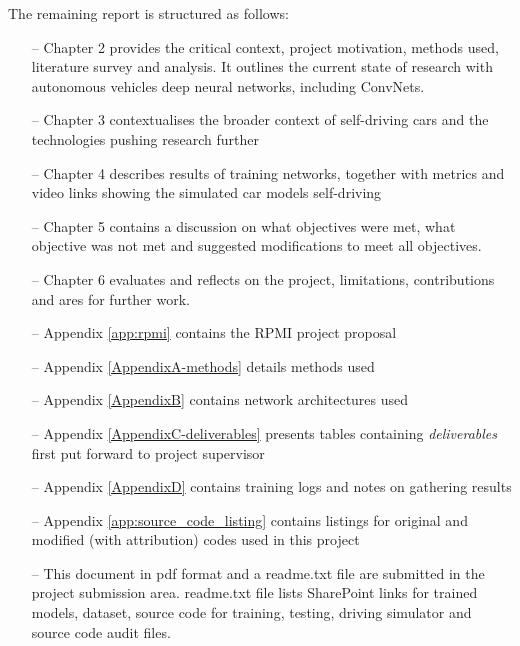 The remaining report is structured as follows:
\begin{itemize}
    \item[--] Chapter 2 provides the critical context, project motivation, methods used, literature survey and analysis. It outlines the current state of research with autonomous vehicles deep neural networks, including ConvNets.
    \item[--] Chapter 3 contextualises the broader context of self-driving cars and the technologies pushing research further
    \item[--] Chapter 4 describes results of training networks, together with metrics and video links showing the simulated car models self-driving
    \item[--] Chapter 5 contains a discussion on what objectives were met, what objective was not met and suggested modifications to meet all objectives.
    \item[--] Chapter 6 evaluates and reflects on the project, limitations, contributions and ares for further work.
    \item[--] Appendix \ref{app:rpmi} contains the RPMI project proposal
    \item[--] Appendix \ref{AppendixA-methods} details methods used 
    \item[--] Appendix \ref{AppendixB} contains network architectures used
    \item[--] Appendix \ref{AppendixC-deliverables}  presents tables containing \textit{deliverables} first put forward to project supervisor 
    \item[--] Appendix \ref{AppendixD} contains training logs and notes on gathering results
    \item[--] Appendix \ref{app:source_code_listing} contains listings for original and modified (with attribution) codes used in this project
    \item[--] This document in pdf format and a readme.txt file are submitted in the project submission area. readme.txt file lists SharePoint links for trained models, dataset, source code for training, testing, driving simulator and source code audit files.
\end{itemize}
